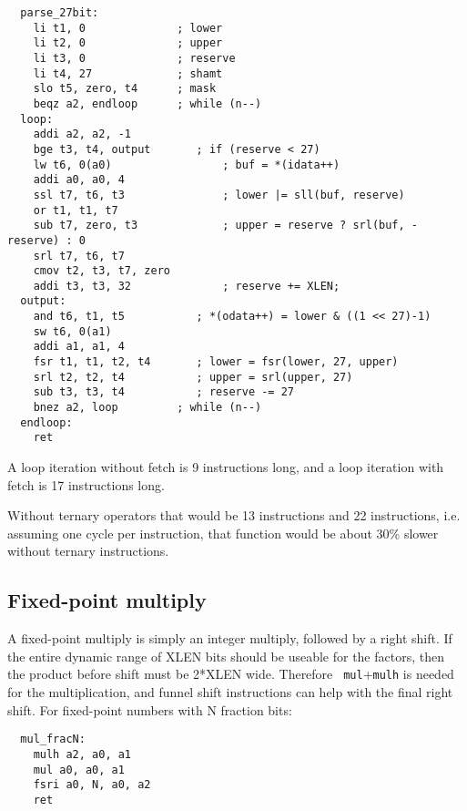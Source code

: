 \begin{minipage}{\linewidth}
\begin{verbatim}
  parse_27bit:
    li t1, 0              ; lower
    li t2, 0              ; upper
    li t3, 0              ; reserve
    li t4, 27             ; shamt
    slo t5, zero, t4      ; mask
    beqz a2, endloop      ; while (n--)
  loop:
    addi a2, a2, -1
    bge t3, t4, output       ; if (reserve < 27)
    lw t6, 0(a0)                 ; buf = *(idata++)
    addi a0, a0, 4
    ssl t7, t6, t3               ; lower |= sll(buf, reserve)
    or t1, t1, t7
    sub t7, zero, t3             ; upper = reserve ? srl(buf, -reserve) : 0
    srl t7, t6, t7
    cmov t2, t3, t7, zero
    addi t3, t3, 32              ; reserve += XLEN;
  output:
    and t6, t1, t5           ; *(odata++) = lower & ((1 << 27)-1)
    sw t6, 0(a1)
    addi a1, a1, 4
    fsr t1, t1, t2, t4       ; lower = fsr(lower, 27, upper)
    srl t2, t2, t4           ; upper = srl(upper, 27)
    sub t3, t3, t4           ; reserve -= 27
    bnez a2, loop         ; while (n--)
  endloop:
    ret
\end{verbatim}
\end{minipage}

A loop iteration without fetch is 9 instructions long, and a loop iteration
with fetch is 17 instructions long.

Without ternary operators that would be 13 instructions and 22 instructions,
i.e. assuming one cycle per instruction, that function would be about 30\%
slower without ternary instructions.

\subsection{Fixed-point multiply}

A fixed-point multiply is simply an integer multiply, followed by a right
shift. If the entire dynamic range of XLEN bits should be useable for the
factors, then the product before shift must be 2*XLEN wide. Therefore {\tt
mul}+{\tt mulh} is needed for the multiplication, and funnel shift instructions
can help with the final right shift. For fixed-point numbers with N fraction
bits:

\begin{minipage}{\linewidth}
\begin{verbatim}
  mul_fracN:
    mulh a2, a0, a1
    mul a0, a0, a1
    fsri a0, N, a0, a2
    ret
\end{verbatim}
\end{minipage}


